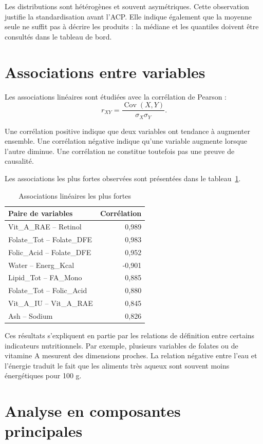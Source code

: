 \documentclass[12pt,a4paper]{article}
\begin{document}
Les distributions sont hétérogènes et souvent asymétriques. Cette observation justifie la standardisation avant l'ACP. Elle indique également que la moyenne seule ne suffit pas à décrire les produits : la médiane et les quantiles doivent être consultés dans le tableau de bord.

\section{Associations entre variables}

Les associations linéaires sont étudiées avec la corrélation de Pearson :
\[
    r_{XY}=\frac{\operatorname{Cov}(X,Y)}{\sigma_X\sigma_Y}.
\]

Une corrélation positive indique que deux variables ont tendance à augmenter ensemble. Une corrélation négative indique qu'une variable augmente lorsque l'autre diminue. Une corrélation ne constitue toutefois pas une preuve de causalité.

Les associations les plus fortes observées sont présentées dans le tableau~\ref{tab:correlations}.

\begin{table}[H]
\centering
\caption{Associations linéaires les plus fortes}
\label{tab:correlations}
\begin{tabular}{lr}
\toprule
Paire de variables & Corrélation \\
\midrule
Vit\_A\_RAE -- Retinol & 0,989 \\
Folate\_Tot -- Folate\_DFE & 0,983 \\
Folic\_Acid -- Folate\_DFE & 0,952 \\
Water -- Energ\_Kcal & -0,901 \\
Lipid\_Tot -- FA\_Mono & 0,885 \\
Folate\_Tot -- Folic\_Acid & 0,880 \\
Vit\_A\_IU -- Vit\_A\_RAE & 0,845 \\
Ash -- Sodium & 0,826 \\
\bottomrule
\end{tabular}
\end{table}

Ces résultats s'expliquent en partie par les relations de définition entre certains indicateurs nutritionnels. Par exemple, plusieurs variables de folates ou de vitamine A mesurent des dimensions proches. La relation négative entre l'eau et l'énergie traduit le fait que les aliments très aqueux sont souvent moins énergétiques pour 100 g.

\section{Analyse en composantes principales}
\end{document}
